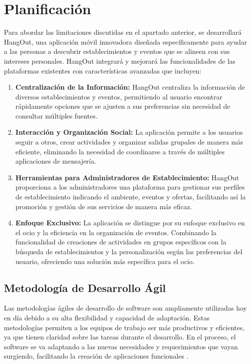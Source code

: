 \chapter{Planificación}

Para abordar las limitaciones discutidas en el apartado anterior, se desarrollará HangOut, una aplicación móvil innovadora diseñada específicamente para ayudar a las personas a descubrir establecimientos y eventos que se alineen con sus intereses personales. HangOut integrará y mejorará las funcionalidades de las plataformas existentes con características avanzadas que incluyen:

\begin{enumerate}
    \item \textbf{Centralización de la Información:} HangOut centraliza la información de diversos establecimientos y eventos, permitiendo al usuario encontrar rápidamente opciones que se ajusten a sus preferencias sin necesidad de consultar múltiples fuentes.

    \item \textbf{Interacción y Organización Social:} La aplicación permite a los usuarios seguir a otros, crear actividades y organizar salidas grupales de manera más eficiente, eliminando la necesidad de coordinarse a través de múltiples aplicaciones de mensajería.

    \item \textbf{Herramientas para Administradores de Establecimiento:} HangOut proporciona a los administradores una plataforma para gestionar sus perfiles de establecimiento indicando el ambiente, eventos y ofertas, facilitando así la promoción y gestión de sus servicios de manera más eficaz.

    \item \textbf{Enfoque Exclusivo:} La aplicación se distingue por su enfoque exclusivo en el ocio y la eficiencia en la organización de eventos. Combinando la funcionalidad de creaciones de actividades en grupos específicos con la búsqueda de establecimientos y la personalización según las preferencias del usuario, ofreciendo una solución más específica para el ocio.
\end{enumerate}

\section{Metodología de Desarrollo Ágil}

Las metodologías ágiles de desarrollo de software son ampliamente utilizadas hoy en día debido a su alta flexibilidad y capacidad de adaptación. Estas metodologías permiten a los equipos de trabajo ser más productivos y eficientes, ya que tienen claridad sobre las tareas durante el desarrollo. En el proceso, el software se va adaptando a las nuevas necesidades y requerimientos que vayan surgiendo, facilitando la creación de aplicaciones funcionales \cite{santander}.

